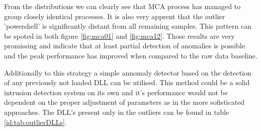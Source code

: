 \documentclass[a4paper,twoside,12pt]{book}
\begin{document}
From the distributions we can clearly see that MCA process has managed to group closely identical processes.
It is also very apprent that the outlier 'powershell' is significantly distant from all remaining samples. 
This pattern can be spoted in both figure \ref{fig:mca01} and \ref{fig:mca12}. Those results are very 
promissing and indicate that at least partial detection of anomalies is possible and the peak performance
has improved when compared to the raw data baseline. 

Additionally to this strategy a simple annomaly detector based on the detection of any previously not loaded
DLL can be utilised. This method could be a solid intrusion detection system on its own and it's performance
would not be dependent on the proper adjustment of parameters as in the more sofisticated approaches. The 
DLL's present only in the outliers can be found in table \ref{id:tab:outlierDLLs}.
\end{document}

